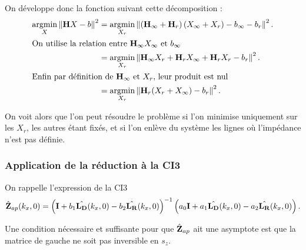 On développe donc la fonction
suivant cette décomposition :
\begin{align*}
{\underset{X}{\operatorname{argmin}}}\left\rVert {\mathbf{H}} X - {b} \right \rVert^2 &= {\underset{X_r}{\operatorname{argmin}}}\left\rVert \left({\mathbf{H}}_\infty + {\mathbf{H}}_r\right)\left( X_\infty + X_r \right) - {b}_\infty - {b}_r \right \rVert^2.
\\
\intertext{On utilise la relation entre \({\mathbf{H}}_\infty X_\infty\) et \({b}_\infty\)}
&=  {\underset{X_r}{\operatorname{argmin}}}\left\rVert {\mathbf{H}}_\infty X_r + {\mathbf{H}}_r X_\infty + {\mathbf{H}}_r X_r - {b}_r \right \rVert^2.
\\
\intertext{Enfin par définition de \({\mathbf{H}}_\infty\) et \(X_r\), leur produit est nul}
&= {\underset{X_r}{\operatorname{argmin}}} \left\rVert {\mathbf{H}}_r ( X_r + X_\infty)- {b}_r \right \rVert^2.
\end{align*}

On voit alors que l'on peut résoudre le problème
si l'on minimise uniquement sur les \(X_r\), les autres étant fixés, et si l'on enlève du système les lignes où l'impédance n'est pas définie.

\subsubsection{Application de la réduction à la CI3}

On rappelle l'expression de la CI3
\begin{equation*}
  \hat{\mathbf{Z}}_{ap}(k_x,0) = \left(\mathbf{I} + b_1 \hat{\mathbf{L_D}}(k_x,0) - b_2 \hat{\mathbf{L_R}}(k_x,0) \right)^{-1}\left(a_0\mathbf{I} + a_1 \hat{\mathbf{L_D}}(k_x,0) - a_2 \hat{\mathbf{L_R}}(k_x,0) \right).
\end{equation*}

Une condition nécessaire et suffisante pour que \(\hat{\mathbf{Z}}_{ap}\) ait une asymptote est que la matrice de gauche ne soit pas inversible en \(s_z\).

